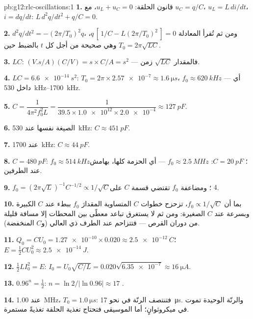 \begin{solution}{pb:g12:rlc-oscillations:1}
\textbf{1.} قانون الحلقة: $u_L + u_C = 0$، مع $u_C = q/C$،
$u_L = L\,di/dt$، $i = dq/dt$: $L\,d^2q/dt^2 + q/C = 0$.

\textbf{2.} $d^2q/dt^2 = -(2\pi/T_0)^2 q$، ومن ثم تُقرأ المعادلة
$q\,[\,1/C - L(2\pi/T_0)^2\,] = 0$، وهي صحيحة من أجل كل $t$ بالضبط حين
$T_0 = 2\pi\sqrt{LC}$.

\textbf{3.} $LC$: $(\unit{V.s/A})(\unit{C/V}) = \unit{s} \times
\unit{C/A} = \unit{s^2}$ --- فالمقدار $\sqrt{LC}$ زمن.

\textbf{4.} $LC = \qty{6.6e-14}{s^2}$: $T_0 = 2\pi \times \num{2.57e-7}
\approx \qty{1.6}{\micro s}$، $f_0 \approx \qty{620}{kHz}$ --- أي داخل
\qtyrange{530}{1700}{kHz}.

\textbf{5.} $C = \dfrac{1}{4\pi^2 f_0^2 L} = \dfrac{1}{39.5 \times
\num{1.0e12} \times \num{2.0e-4}} \approx \qty{127}{pF}$.

\textbf{6.} الصيغة نفسها عند \qty{530}{kHz}: $C \approx \qty{451}{pF}$.

\textbf{7.} عند \qty{1700}{kHz}: $C \approx \qty{44}{pF}$.

\textbf{8.} $C = \qty{480}{pF}$: $f_0 \approx \qty{514}{kHz}$؛
$C = \qty{20}{pF}$: $f_0 \approx \qty{2.5}{MHz}$ --- أي الحزمة كلها،
بهامش عند الطرفين.

\textbf{9.} $f_0 = (2\pi\sqrt{L})^{-1}C^{-1/2} \propto 1/\sqrt{C}$؛
ومضاعفة $f_0$ تقتضي قسمة $C$ على $4$.

\textbf{10.} بما أن $f_0 \propto 1/\sqrt{C}$، تزحزح خطوات $C$ المتساوية
المقدارَ $f_0$ ببطء عند $C$ الكبيرة وبسرعة عند $C$ الصغيرة: ومن ثم لا
يستغرق تباعد معطًى بين المحطات إلا مسافة قليلة من دوران القرص --- فتتزاحم عند
الطرف ذي  العالي (و$C$ المنخفضة).

\textbf{11.} $Q_0 = CU_0 = \num{1.27e-10} \times 0.020 \approx
\qty{2.5e-12}{C}$؛ $E = \tfrac12 CU_0^2 \approx \qty{2.5e-14}{J}$.

\textbf{12.} $\tfrac12 LI_0^2 = E$: $I_0 = U_0\sqrt{C/L} =
0.020\sqrt{\num{6.35e-7}} \approx \qty{16}{\micro A}$.

\textbf{13.} $0.96^n = \tfrac12$: $n = \ln 2/\lvert\ln 0.96\rvert
\approx 17$ .

\textbf{14.} عند \qty{1.00}{MHz}، $T_0 = \qty{1.0}{\micro s}$: فتنتصف الرنّة
في نحو \qty{17}{\micro s}. والرنّة الوحيدة تموت في ميكروثوانٍ؛
أما الموسيقى فتحتاج تغذية الحلقة تغذيةً مستمرة.


\end{solution}
